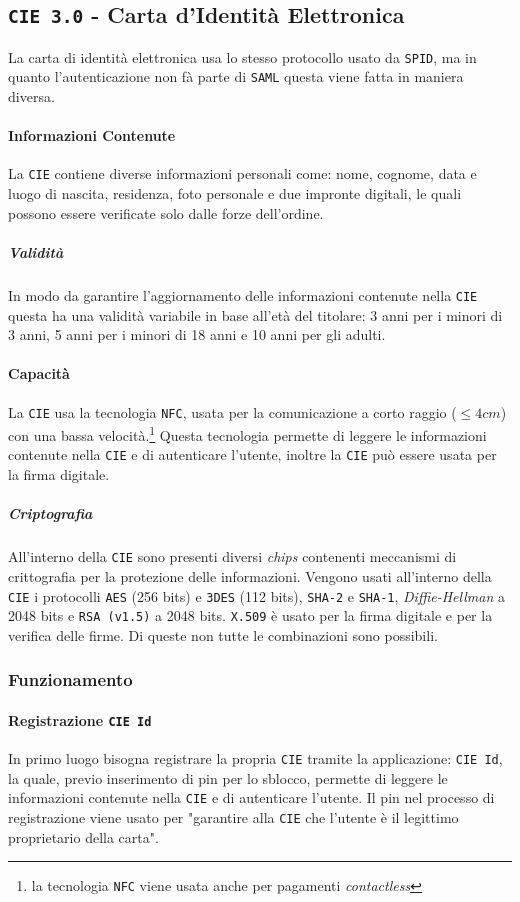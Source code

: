    \subsection{\texttt{CIE 3.0} - Carta d'Identità Elettronica}
        La carta di identità elettronica usa lo stesso protocollo usato da \texttt{SPID}, ma in quanto l'autenticazione non fà parte di \texttt{SAML} questa viene fatta in maniera diversa.
        \paragraph{Informazioni Contenute} La \texttt{CIE} contiene diverse informazioni personali come: nome, cognome, data e luogo di nascita, residenza, foto personale e due impronte digitali, le quali possono essere verificate solo dalle forze dell'ordine.
            \subparagraph{Validità} In modo da garantire l'aggiornamento delle informazioni contenute nella \texttt{CIE} questa ha una validità variabile in base all'età del titolare: 3 anni per i minori di 3 anni, 5 anni per i minori di 18 anni e 10 anni per gli adulti.
        \paragraph{Capacità} La \texttt{CIE} usa la tecnologia \texttt{NFC}, usata per la comunicazione a corto raggio ($\leq 4cm$) con una bassa velocità.\footnote{la tecnologia \texttt{NFC} viene usata anche per pagamenti \textit{contactless}} Questa tecnologia permette di leggere le informazioni contenute nella \texttt{CIE} e di autenticare l'utente, inoltre la \texttt{CIE} può essere usata per la firma digitale.
            \subparagraph{Criptografia} All'interno della \texttt{CIE} sono presenti diversi \textit{chips} contenenti meccanismi di crittografia per la protezione delle informazioni. Vengono usati all'interno della \texttt{CIE} i protocolli \texttt{AES} (256 bits) e \texttt{3DES} (112 bits), \texttt{SHA-2} e \texttt{SHA-1}, \textit{Diffie-Hellman} a 2048 bits e \texttt{RSA (v1.5)} a 2048 bits. \texttt{X.509} è usato per la firma digitale e per la verifica delle firme.\newline
        Di queste non tutte le combinazioni sono possibili. 
        \subsubsection{Funzionamento}
            \paragraph{Registrazione \texttt{CIE Id}} In primo luogo bisogna registrare la propria \texttt{CIE} tramite la applicazione: \texttt{CIE Id}, la quale, previo inserimento di pin per lo sblocco, permette di leggere le informazioni contenute nella \texttt{CIE} e di autenticare l'utente. Il pin nel processo di registrazione viene usato per "garantire alla \texttt{CIE} che l'utente è il legittimo proprietario della carta". 
